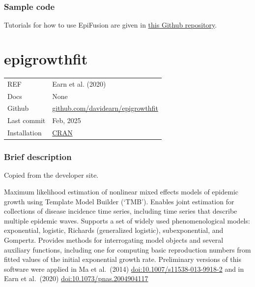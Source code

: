 \documentclass[
  letterpaper,
  DIV=11,
  numbers=noendperiod]{scrreprt}
\begin{document}
\subsection*{Sample code}\label{sample-code-4}

Tutorials for how to use EpiFusion are given in
\href{https://github.com/ciarajudge/EpiFusion/tree/main/examples}{this
Github repository}.

\chapter*{epigrowthfit}\label{epigrowthfit}


\begin{longtable}[]{@{}
  >{\raggedright\arraybackslash}p{}
  >{\raggedright\arraybackslash}p{}@{}}
\toprule\noalign{}
\endhead
\bottomrule\noalign{}
\endlastfoot
REF & Earn et al. (2020) \\
Docs & None \\
Github &
\href{https://github.com/davidearn/epigrowthfit}{github.com/davidearn/epigrowthfit} \\
Last commit & Feb, 2025 \\
Installation &
\href{https://cran.r-project.org/web/packages/epigrowthfit/index.html}{CRAN} \\
\end{longtable}

\subsection*{Brief description}\label{brief-description-6}

Copied from the developer site.

Maximum likelihood estimation of nonlinear mixed effects models of
epidemic growth using Template Model Builder (`TMB'). Enables joint
estimation for collections of disease incidence time series, including
time series that describe multiple epidemic waves. Supports a set of
widely used phenomenological models: exponential, logistic, Richards
(generalized logistic), subexponential, and Gompertz. Provides methods
for interrogating model objects and several auxiliary functions,
including one for computing basic reproduction numbers from fitted
values of the initial exponential growth rate. Preliminary versions of
this software were applied in Ma et al.~(2014)
\url{doi:10.1007/s11538-013-9918-2} and in Earn et al.~(2020)
\url{doi:10.1073/pnas.2004904117}
\end{document}
